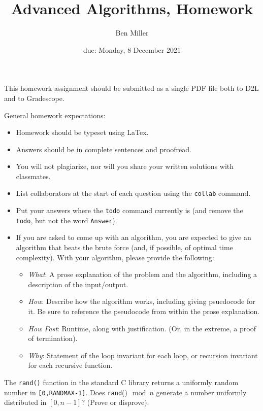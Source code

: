 \documentclass{article}
\title{Advanced Algorithms, Homework \hwnum}
\author{Ben Miller}
\date{due: Monday, 8 December 2021}
\begin{document}
\maketitle

This homework assignment should be
submitted as a single PDF file both to D2L and to Gradescope.

General homework expectations:
\begin{itemize}
    \item Homework should be typeset using LaTex.
    \item Answers should be in complete sentences and proofread.
    \item You will not plagiarize, nor will you share your written solutions
        with classmates.
    \item List collaborators at the start of each question using the
        \texttt{collab} command.
    \item Put your answers where the \texttt{todo} command currently is (and
        remove the \texttt{todo}, but not the word \texttt{Answer}).
    \item If you are asked to come up with an algorithm, you are
        expected to give an algorithm that beats the brute force (and, if possible, of
        optimal time complexity). With your algorithm, please provide the following:
        \begin{itemize}
            \item \emph{What}: A prose explanation of the problem and the algorithm,
                including a description of the input/output.
            \item \emph{How}: Describe how the algorithm works, including giving
                psuedocode for it.  Be sure to reference the pseudocode
                from within the prose explanation.
            \item \emph{How Fast}: Runtime, along with justification.  (Or, in the
                extreme, a proof of termination).
            \item \emph{Why}: Statement of the loop invariant for each loop, or
                recursion invariant for each recursive function.
        \end{itemize}
\end{itemize}


\nextprob{}

The \texttt{rand()} function in the standard C library returns a
uniformly random number in \texttt{[0,RANDMAX-1]}. Does \texttt{rand}()$\mod n$
generate a number uniformly distributed in $[0,n-1]$? (Prove or disprove).
\end{document}
